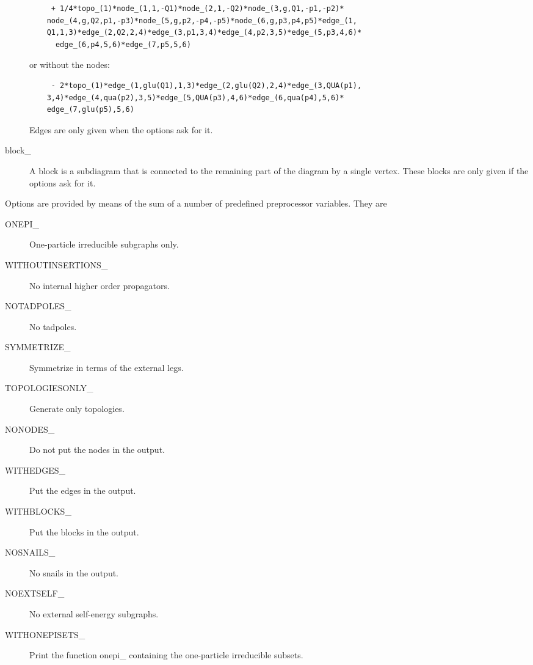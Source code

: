 \begin{description}
\begin{verbatim}
     + 1/4*topo_(1)*node_(1,1,-Q1)*node_(2,1,-Q2)*node_(3,g,Q1,-p1,-p2)*
    node_(4,g,Q2,p1,-p3)*node_(5,g,p2,-p4,-p5)*node_(6,g,p3,p4,p5)*edge_(1,
    Q1,1,3)*edge_(2,Q2,2,4)*edge_(3,p1,3,4)*edge_(4,p2,3,5)*edge_(5,p3,4,6)*
      edge_(6,p4,5,6)*edge_(7,p5,5,6)
\end{verbatim}
or without the nodes:
\begin{verbatim}
     - 2*topo_(1)*edge_(1,glu(Q1),1,3)*edge_(2,glu(Q2),2,4)*edge_(3,QUA(p1),
    3,4)*edge_(4,qua(p2),3,5)*edge_(5,QUA(p3),4,6)*edge_(6,qua(p4),5,6)*
    edge_(7,glu(p5),5,6)
\end{verbatim}
Edges are only given when the options ask for it.
\item[block\_] A block is a subdiagram that is connected to the remaining 
part of the diagram by a single vertex. These blocks are only given if the 
options ask for it.
\end{description}

Options are provided by means of the sum of a number of predefined 
preprocessor variables. They are
\begin{description}
\item[ONEPI\_] One-particle irreducible subgraphs only.
\item[WITHOUTINSERTIONS\_] No internal higher order propagators.
\item[NOTADPOLES\_] No tadpoles.
\item[SYMMETRIZE\_] Symmetrize in terms of the external legs.
\item[TOPOLOGIESONLY\_] Generate only topologies.
\item[NONODES\_] Do not put the nodes in the output.
\item[WITHEDGES\_] Put the edges in the output.
\item[WITHBLOCKS\_] Put the blocks in the output.
\item[NOSNAILS\_] No snails in the output.
\item[NOEXTSELF\_] No external self-energy subgraphs.
\item[WITHONEPISETS\_] Print the function onepi\_ containing the 
one-particle irreducible subsets.
\end{description}

